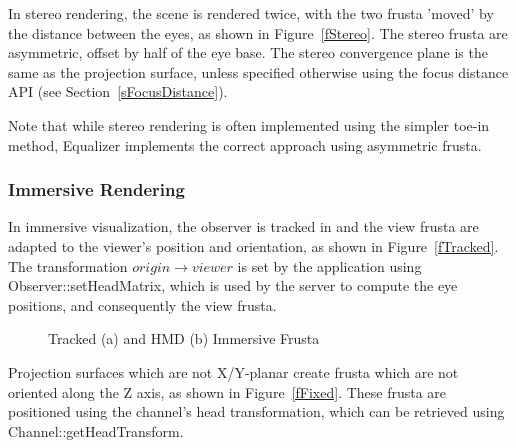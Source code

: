 \documentclass[10pt,a4]{scrartcl}
\newcommand{\fig}[1]{Figure~\ref{#1}}
\newcommand{\sref}[1]{Section~\ref{#1}}
\begin{document}
In stereo rendering, the scene is rendered twice, with the two frusta
'moved' by the distance between the eyes, as shown in \fig{fStereo}. The stereo
frusta are asymmetric, offset by half of the eye base. The stereo convergence
plane is the same as the projection surface, unless specified otherwise using
the focus distance API (see \sref{sFocusDistance}).

Note that while stereo rendering is often implemented using the simpler toe-in
method, Equalizer implements the correct approach using asymmetric frusta.

\subsubsection{Immersive Rendering}

In immersive visualization, the observer is tracked in and the view
frusta are adapted to the viewer's position and orientation, as shown
in \fig{fTracked}. The transformation $origin \rightarrow viewer$ is set by
the application using \textsf{Observer::setHead\-Matrix}, which is used by
the server to compute the eye positions, and consequently the view frusta.

\begin{figure}[h!t]\center
  \hfil
  {\caption{\label{fImmersive}Tracked (a) and HMD (b) Immersive Frusta}}
\end{figure}

Projection surfaces which are not X/Y-planar create frusta which are not
oriented along the Z axis, as shown in \fig{fFixed}. These frusta are positioned
using the channel's head transformation, which can be retrieved using
\textsf{Channel::getHeadTransform}.
\end{document}
